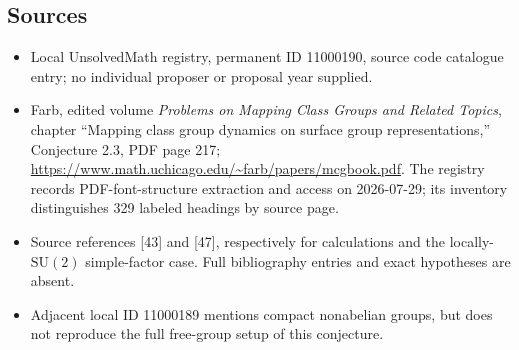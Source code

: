 \documentclass[11pt]{article}
\begin{document}
\subsection{Sources}
\begin{itemize}
\item Local UnsolvedMath registry, permanent ID 11000190, source code catalogue entry; no individual proposer or proposal year supplied.
\item Farb, edited volume \emph{Problems on Mapping Class Groups and Related Topics}, chapter ``Mapping class group dynamics on surface group representations,'' Conjecture 2.3, PDF page 217; \url{https://www.math.uchicago.edu/~farb/papers/mcgbook.pdf}. The registry records PDF-font-structure extraction and access on 2026-07-29; its inventory distinguishes 329 labeled headings by source page.
\item Source references [43] and [47], respectively for calculations and the locally-$\mathrm{SU}(2)$ simple-factor case. Full bibliography entries and exact hypotheses are absent.
\item Adjacent local ID 11000189 mentions compact nonabelian groups, but does not reproduce the full free-group setup of this conjecture.
\end{itemize}
\end{document}
